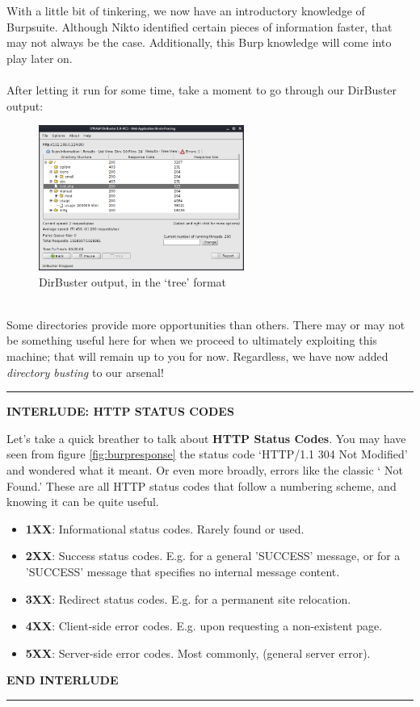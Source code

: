 \documentclass[a4paper,11pt]{article}
\renewcommand{\tt}[2][tt]{\textcolor{#1}{\ttfamily #2}}%
\begin{document}
With a little bit of tinkering, we now have an introductory knowledge of Burpsuite. Although Nikto identified certain pieces of information faster, that may not always be the case. Additionally, this Burp knowledge will come into play later on.
\\
\\
After letting it run for some time, take a moment to go through our DirBuster output:
\begin{figure}[h]
    \centering
    \includegraphics[width=0.6\textwidth]{images/dirbuster_output.png}
    \caption{DirBuster output, in the `tree' format}
    \label{fig:dirbuster_output}
\end{figure}
\\
Some directories provide more opportunities than others. There may or may not be something useful here for when we proceed to ultimately exploiting this machine; that will remain up to you for now. Regardless, we have now added \textit{directory busting} to our arsenal!


\par\noindent\rule{\textwidth}{0.4pt}
\begin{center}
    {\bfseries INTERLUDE: HTTP STATUS CODES}
\end{center}
Let's take a quick breather to talk about {\bfseries HTTP Status Codes}. You may have seen from figure \ref{fig:burpresponse} the status code `\tt{HTTP/1.1 304 Not Modified}' and wondered what it meant. Or even more broadly, errors like the classic `\tt{404 Not Found}.' These are all HTTP status codes that follow a numbering scheme, and knowing it can be quite useful.
\begin{itemize}
    \item {\bfseries 1XX}: Informational status codes. Rarely found or used.
    \item {\bfseries 2XX}: Success status codes. E.g. \tt{200} for a general 'SUCCESS' message, or \tt{204} for a 'SUCCESS' message that specifies no internal message content.
    \item {\bfseries 3XX}: Redirect status codes. E.g. \tt{301} for a permanent site relocation.
    \item {\bfseries 4XX}: Client-side error codes. E.g. \tt{404} upon requesting a non-existent page.
    \item {\bfseries 5XX}: Server-side error codes. Most commonly, \tt{500} (general server error).
\end{itemize}
\begin{center}
    {\bfseries END INTERLUDE}
\end{center}
\par\noindent\rule{\textwidth}{0.4pt}
\end{document}
